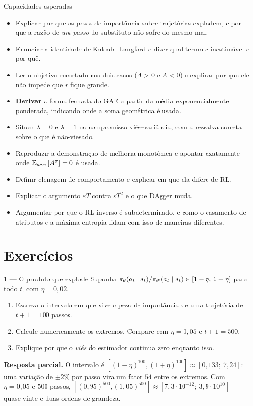 \documentclass[11pt]{article}
\newcommand{\thv}{\theta}
\newcommand{\polth}{\pol_{\thv}}
\newcommand{\Adv}{A}
\newcommand{\Advpi}{A^{\pol}}
\begin{document}
\begin{defbox}{Capacidades esperadas}
\begin{itemize}
  \item Explicar por que os pesos de importância sobre trajetórias explodem, e por que a
    razão de \emph{um passo} do substituto não sofre do mesmo mal.
  \item Enunciar a identidade de Kakade--Langford e dizer qual termo é inestimável e por quê.
  \item Ler o objetivo recortado nos dois casos ($\Adv>0$ e $\Adv<0$) e explicar por que
    ele não impede que $r$ fique grande.
  \item \textbf{Derivar} a forma fechada do GAE a partir da média exponencialmente
    ponderada, indicando onde a soma geométrica é usada.
  \item Situar $\lambda = 0$ e $\lambda = 1$ no compromisso viés--variância, com a
    ressalva correta sobre o que é não-viesado.
  \item Reproduzir a demonstração de melhoria monotônica e apontar exatamente onde
    $\E_{a\sim\pol}[\Advpi] = 0$ é usada.
  \item Definir clonagem de comportamento e explicar em que ela difere de RL.
  \item Explicar o argumento $\varepsilon T$ contra $\varepsilon T^2$ e o que DAgger muda.
  \item Argumentar por que o RL inverso é subdeterminado, e como o casamento de atributos
    e a máxima entropia lidam com isso de maneiras diferentes.
\end{itemize}
\end{defbox}

\section{Exercícios}

\begin{exbox}{1 --- O produto que explode}
  Suponha $\polth(a_t\mid s_t)/\pol_{\thv'}(a_t\mid s_t) \in [1-\eta,\,1+\eta]$ para todo
  $t$, com $\eta = 0{,}02$.
  \begin{enumerate}
    \item Escreva o intervalo em que vive o peso de importância de uma trajetória de
      $t+1 = 100$ passos.
    \item Calcule numericamente os extremos. Compare com $\eta = 0{,}05$ e $t+1 = 500$.
    \item Explique por que o \emph{viés} do estimador continua zero enquanto isso.
  \end{enumerate}
  \textbf{Resposta parcial.} O intervalo é $[(1-\eta)^{100},(1+\eta)^{100}]
  \approx [0{,}133;\ 7{,}24]$: uma variação de $\pm2\%$ por passo vira um fator $54$ entre
  os extremos. Com $\eta=0{,}05$ e $500$ passos, $[(0{,}95)^{500},(1{,}05)^{500}]
  \approx [7{,}3\cdot10^{-12};\ 3{,}9\cdot10^{10}]$ --- quase vinte e duas ordens de grandeza.
\end{exbox}
\end{document}
